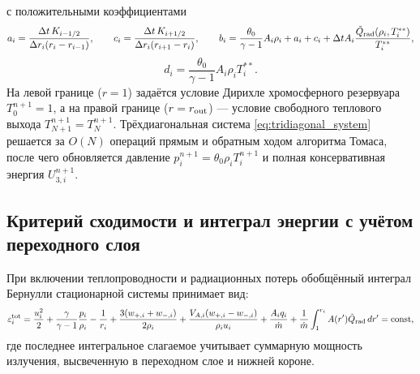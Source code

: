 \documentclass[11pt,a4paper]{article}
\begin{document}
с положительными коэффициентами
\[
a_i = \frac{\Delta t\, K_{i-1/2}}{\Delta r_i (r_i - r_{i-1})}, \qquad
c_i = \frac{\Delta t\, K_{i+1/2}}{\Delta r_i (r_{i+1} - r_i)}, \qquad
b_i = \frac{\theta_0}{\gamma-1}A_i\rho_i + a_i + c_i + \Delta t A_i \frac{\tilde{Q}_{\rm rad}(\rho_i, T_i^{**})}{T_i^{**}},
\]
\[
d_i = \frac{\theta_0}{\gamma-1}A_i\rho_i T_i^{**}.
\]
На левой границе ($r = 1$) задаётся условие Дирихле хромосферного резервуара $T_0^{n+1} = 1$, а на правой границе ($r = r_{\rm out}$) --- условие свободного теплового выхода $T_{N+1}^{n+1} = T_N^{n+1}$. Трёхдиагональная система \eqref{eq:tridiagonal_system} решается за $O(N)$ операций прямым и обратным ходом алгоритма Томаса, после чего обновляется давление $p_i^{n+1} = \theta_0\rho_i T_i^{n+1}$ и полная консервативная энергия $U_{3,i}^{n+1}$.

\subsection{Критерий сходимости и интеграл энергии с учётом переходного слоя}

При включении теплопроводности и радиационных потерь обобщённый интеграл Бернулли стационарной системы принимает вид:
\begin{equation}
\varepsilon_i^{\rm tot} = \frac{u_i^2}{2} + \frac{\gamma}{\gamma-1}\frac{p_i}{\rho_i} - \frac{1}{r_i} + \frac{3(w_{+,i} + w_{-,i})}{2\rho_i} + \frac{V_{A,i}(w_{+,i} - w_{-,i})}{\rho_i u_i} + \frac{A_i q_i}{\dot{m}} + \frac{1}{\dot{m}}\int_1^{r_i} A(r')\tilde{Q}_{\rm rad}\,dr' = \mathrm{const},
\label{eq:bernoulli_with_tr}
\end{equation}
где последнее интегральное слагаемое учитывает суммарную мощность излучения, высвеченную в переходном слое и нижней короне.
\end{document}
